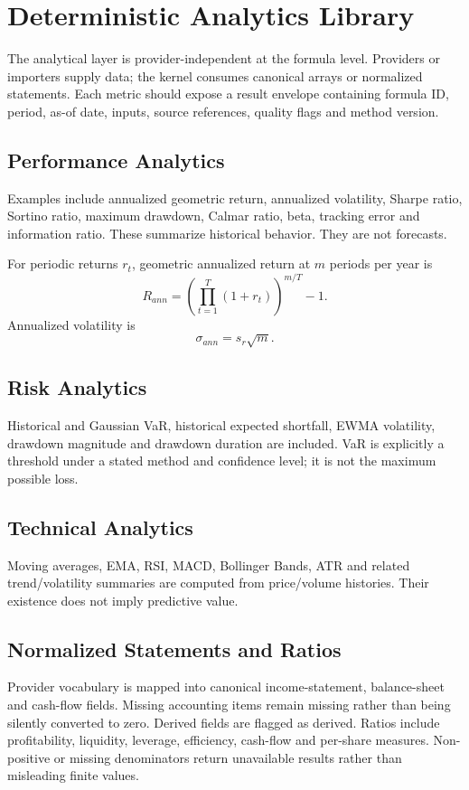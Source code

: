 \documentclass[11pt]{article}
\begin{document}
\section{Deterministic Analytics Library}
The analytical layer is provider-independent at the formula level. Providers or importers supply data; the kernel consumes canonical arrays or normalized statements. Each metric should expose a result envelope containing formula ID, period, as-of date, inputs, source references, quality flags and method version.

\subsection{Performance Analytics}
Examples include annualized geometric return, annualized volatility, Sharpe ratio, Sortino ratio, maximum drawdown, Calmar ratio, beta, tracking error and information ratio. These summarize historical behavior. They are not forecasts.

For periodic returns $r_t$, geometric annualized return at $m$ periods per year is
\begin{equation}
R_{ann}=\left(\prod_{t=1}^T(1+r_t)\right)^{m/T}-1.
\end{equation}
Annualized volatility is
\begin{equation}
\sigma_{ann}=s_r\sqrt{m}.
\end{equation}

\subsection{Risk Analytics}
Historical and Gaussian VaR, historical expected shortfall, EWMA volatility, drawdown magnitude and drawdown duration are included. VaR is explicitly a threshold under a stated method and confidence level; it is not the maximum possible loss.

\subsection{Technical Analytics}
Moving averages, EMA, RSI, MACD, Bollinger Bands, ATR and related trend/volatility summaries are computed from price/volume histories. Their existence does not imply predictive value.

\subsection{Normalized Statements and Ratios}
Provider vocabulary is mapped into canonical income-statement, balance-sheet and cash-flow fields. Missing accounting items remain missing rather than being silently converted to zero. Derived fields are flagged as derived. Ratios include profitability, liquidity, leverage, efficiency, cash-flow and per-share measures. Non-positive or missing denominators return unavailable results rather than misleading finite values.
\end{document}
